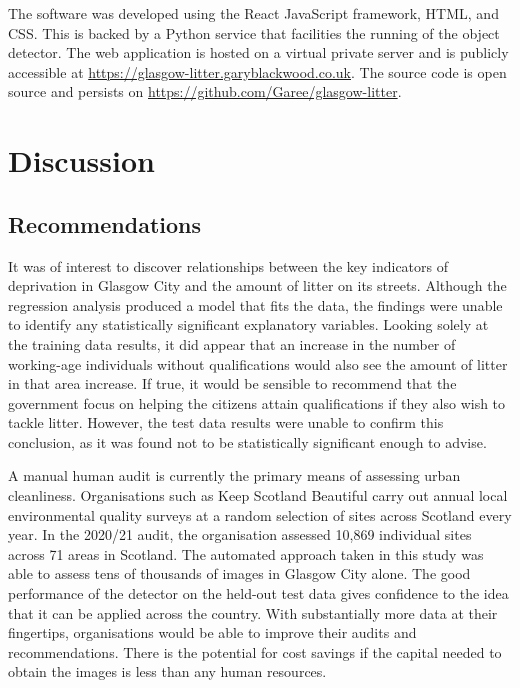 \documentclass{thesis}
\begin{document}
The software was developed using the React JavaScript framework, HTML, and CSS. This is backed by a Python service that facilities the running of the object detector. The web application is hosted on a virtual private server and is publicly accessible at \url{https://glasgow-litter.garyblackwood.co.uk}. The source code is open source and persists on \url{https://github.com/Garee/glasgow-litter}.



\chapter{Discussion}

\section{Recommendations}

It was of interest to discover relationships between the key indicators of deprivation in Glasgow City and the amount of litter on its streets. Although the regression analysis produced a model that fits the data, the findings were unable to identify any statistically significant explanatory variables. Looking solely at the training data results, it did appear that an increase in the number of working-age individuals without qualifications would also see the amount of litter in that area increase. If true, it would be sensible to recommend that the government focus on helping the citizens attain qualifications if they also wish to tackle litter. However, the test data results were unable to confirm this conclusion, as it was found not to be statistically significant enough to advise.

A manual human audit is currently the primary means of assessing urban cleanliness. Organisations such as Keep Scotland Beautiful carry out annual local environmental quality surveys at a random selection of sites across Scotland every year\cite{leams}. In the 2020/21 audit, the organisation assessed 10,869 individual sites across 71 areas in Scotland. The automated approach taken in this study was able to assess tens of thousands of images in Glasgow City alone. The good performance of the detector on the held-out test data gives confidence to the idea that it can be applied across the country. With substantially more data at their fingertips, organisations would be able to improve their audits and recommendations. There is the potential for cost savings if the capital needed to obtain the images is less than any human resources.
\end{document}
